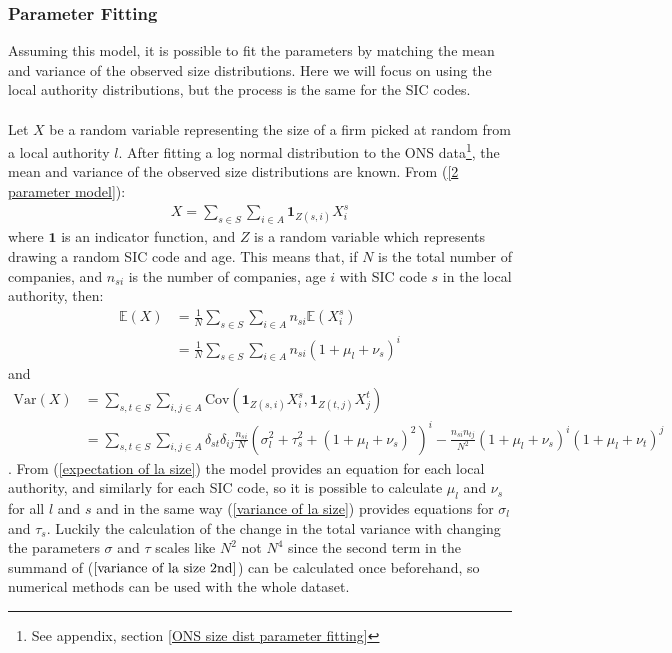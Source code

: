 \documentclass[a4paper,10pt]{article}
\begin{document}
\subsubsection{Parameter Fitting}
\label{model parameter fitting}
Assuming this model, it is possible to fit the parameters by matching the mean and variance of the observed size distributions. Here we will focus on using the local authority distributions, but the process is the same for the SIC codes.
\\\\ Let $X$ be a random variable representing the size of a firm picked at random from a local authority $l$. After fitting a log normal distribution to the ONS data\footnote{See appendix, section \ref{ONS size dist parameter fitting}}, the mean and variance of the observed size distributions are known. From (\ref{2 parameter model}):
\begin{align}
 X = \sum_{s \in S} \sum_{i \in A}\mathbf{1}_{Z(s,i)}X_i^s
\end{align}
where $\mathbf{1}$ is an indicator function, and $Z$ is a random variable which represents drawing a random SIC code and age. This means that, if $N$ is the total number of companies, and $n_{si}$ is the number of companies, age $i$ with SIC code $s$ in the local authority, then:
\begin{align}
 \label{expectation of la size}
 \mathbb{E}(X) &= \frac{1}{N}\sum_{s \in S}\sum_{i \in A}n_{si}\mathbb{E}(X_i^s)\\
 &= \frac{1}{N}\sum_{s \in S}\sum_{i \in A}n_{si}(1 + \mu_l + \nu_s)^i
\end{align}
and 
\begin{align}
 \label{variance of la size}
 \mathrm{Var}(X) &= \sum_{s, t \in S}\sum_{i, j \in A}\mathrm{Cov}(\mathbf{1}_{Z(s, i)}X_i^s, \mathbf{1}_{Z(t, j)}X_j^t)\\
 &= \sum_{s, t \in S}\sum_{i, j \in A}\delta_{st}\delta_{ij}\frac{n_{si}}{N}\left(\sigma_l^2 + \tau_s^2 + (1 + \mu_l + \nu_s)^2\right)^i - \frac{n_{si}n_{tj}}{N^2}(1 + \mu_l + \nu_s)^i(1 + \mu_l + \nu_t)^j
 \label{variance of la size 2nd}
\end{align}
. From (\ref{expectation of la size}) the model provides an equation for each local authority, and similarly for each SIC code, so it is possible to calculate $\mu_l$ and $\nu_s$ for all $l$ and $s$ and in the same way (\ref{variance of la size}) provides equations for $\sigma_l$ and $\tau_s$. Luckily the calculation of the change in the total variance with changing the parameters $\sigma$ and $\tau$ scales like $N^2$ not $N^4$ since the second term in the summand of ($\ref{variance of la size 2nd}$) can be calculated once beforehand, so numerical methods can be used with the whole dataset.
\end{document}
